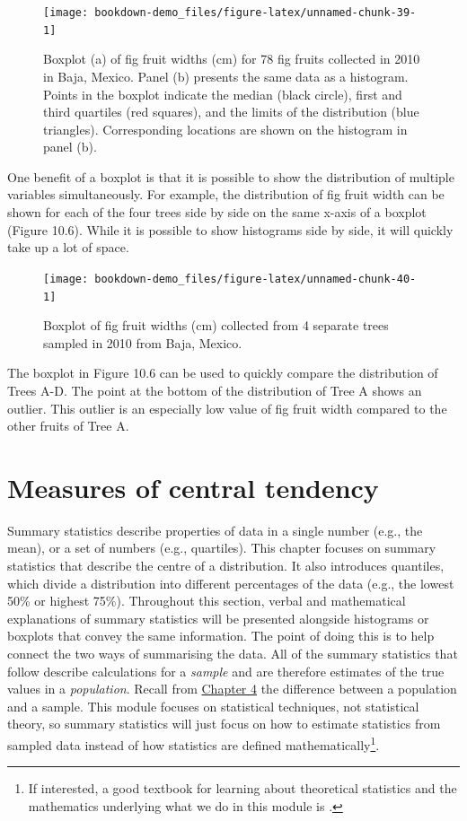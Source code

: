 \documentclass[
]{scrbook}
\begin{document}
\begin{figure}
\texttt{[image: bookdown-demo\_files/figure-latex/unnamed-chunk-39-1]} \caption{Boxplot (a) of fig fruit widths (cm) for 78 fig fruits collected in 2010 in Baja, Mexico. Panel (b) presents the same data as a histogram. Points in the boxplot indicate the median (black circle), first and third quartiles (red squares), and the limits of the distribution (blue triangles). Corresponding locations are shown on the histogram in panel (b).}\label{fig:unnamed-chunk-39}
\end{figure}

One benefit of a boxplot is that it is possible to show the distribution of multiple variables simultaneously.
For example, the distribution of fig fruit width can be shown for each of the four trees side by side on the same x-axis of a boxplot (Figure 10.6).
While it is possible to show histograms side by side, it will quickly take up a lot of space.

\begin{figure}
\texttt{[image: bookdown-demo\_files/figure-latex/unnamed-chunk-40-1]} \caption{Boxplot of fig fruit widths (cm) collected from 4 separate trees sampled in 2010 from Baja, Mexico.}\label{fig:unnamed-chunk-40}
\end{figure}

The boxplot in Figure 10.6 can be used to quickly compare the distribution of Trees A-D.
The point at the bottom of the distribution of Tree A shows an outlier.
This outlier is an especially low value of fig fruit width compared to the other fruits of Tree A.

\hypertarget{Chapter_11}{%
\chapter{Measures of central tendency}\label{Chapter_11}}

Summary statistics describe properties of data in a single number (e.g., the mean), or a set of numbers (e.g., quartiles).
This chapter focuses on summary statistics that describe the centre of a distribution.
It also introduces quantiles, which divide a distribution into different percentages of the data (e.g., the lowest 50\% or highest 75\%).
Throughout this section, verbal and mathematical explanations of summary statistics will be presented alongside histograms or boxplots that convey the same information.
The point of doing this is to help connect the two ways of summarising the data.
All of the summary statistics that follow describe calculations for a \emph{sample} and are therefore estimates of the true values in a \emph{population}.
Recall from \protect\hyperlink{Chapter_4}{Chapter 4} the difference between a population and a sample.
This module focuses on statistical techniques, not statistical theory, so summary statistics will just focus on how to estimate statistics from sampled data instead of how statistics are defined mathematically\footnote{If interested, a good textbook for learning about theoretical statistics and the mathematics underlying what we do in this module is \citet{Miller2004}.}.
\end{document}
